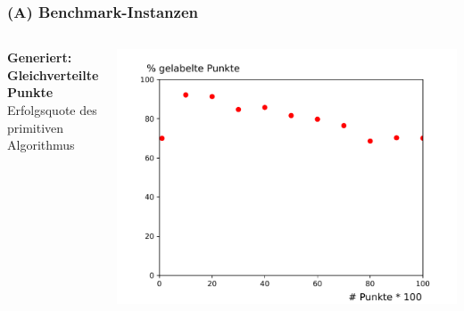 \documentclass[aspectratio=169]{beamer}
\begin{document}
\begin{frame}
	\frametitle{(A) Benchmark-Instanzen}
	\begin{columns}[c] %
	
	\textbf{Generiert: Gleichverteilte Punkte}\\
	Erfolgsquote des primitiven Algorithmus
	
	
	\includegraphics[scale=.45]{cluster_solve.pdf}
	

	\end{columns}
	\end{frame}

\end{document}
